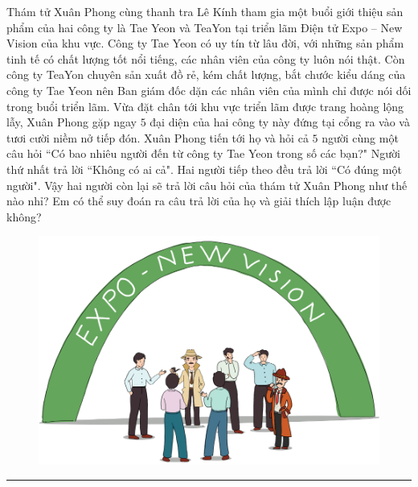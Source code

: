 \begin{multicols}{2}
	Thám tử Xuân Phong cùng thanh tra Lê Kính tham gia một buổi giới thiệu sản phẩm của hai công ty là Tae Yeon và TeaYon tại triển lãm Điện tử Expo -- New Vision của khu vực. Công ty  Tae Yeon có uy tín từ lâu đời, với những sản phẩm tinh tế có chất lượng tốt nổi tiếng,  các nhân viên của công ty luôn nói thật. Còn công ty TeaYon chuyên sản xuất đồ rẻ, kém chất lượng, bắt chước kiểu dáng của công ty Tae Yeon nên Ban giám đốc dặn các nhân viên của mình chỉ được nói dối trong buổi triển lãm. 
	\vskip 0.1cm
	Vừa đặt chân tới khu vực triển lãm được trang hoàng lộng lẫy, Xuân Phong gặp ngay $5$ đại diện  của hai công ty này đứng tại cổng ra vào và tươi cười niềm nở tiếp đón. Xuân Phong tiến tới họ và hỏi cả $5$ người cùng một câu hỏi ``Có bao nhiêu người đến từ công ty Tae Yeon trong số các bạn?" 
	\vskip 0.1cm
	Người thứ nhất trả lời ``Không có ai cả". Hai người tiếp theo đều trả lời ``Có đúng một người". 
	\vskip 0.1cm
	Vậy hai người còn lại sẽ trả lời câu hỏi của thám tử Xuân Phong như thế nào nhỉ? Em có thể suy đoán ra câu trả lời của họ và giải thích lập luận được không?
	\begin{figure}[H]
		\centering
		\vspace*{-5pt}
		\captionsetup{labelformat= empty, justification=centering}
		\includegraphics[width=1\linewidth]{xuanphong}
		\vspace*{-5pt}
	\end{figure}
\end{multicols}
\vspace*{-10pt}
{\color{toancuabi}\rule{1\linewidth}{0.1pt}}
\begingroup
